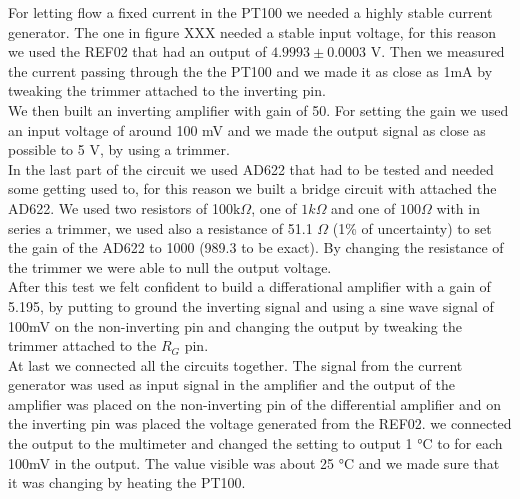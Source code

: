 For letting flow a fixed current in the PT100 we needed a highly stable current generator. The one in figure XXX needed a stable input voltage, for this  reason we used the REF02 that had an output of $4.9993 \pm 0.0003$ V. Then we measured the current passing through the the PT100 and we made it as close as 1mA by tweaking the trimmer attached to the inverting pin.\\

We then built an inverting amplifier with gain of 50. For setting the gain we used an input voltage of around 100 mV and we made the output signal as close as possible to 5 V, by using a trimmer.\\

In the last part of the circuit we used AD622 that had to be tested and needed some getting used  to, for this reason we built a bridge circuit with attached the AD622. We used two resistors of 100k$\Omega$, one of $1k\Omega$ and one of $100 \Omega$ with in series a trimmer, we used also a resistance of 51.1 $\Omega$ (1\% of uncertainty) to set the gain of the AD622 to 1000 (989.3 to be exact). By changing the resistance of the trimmer we were able to null the output voltage.\\

After this test we felt confident to build a differational amplifier with a gain of 5.195, by putting to ground the inverting signal and using a sine wave signal of 100mV on the non-inverting pin and changing the output by tweaking the trimmer attached to the $R_G$ pin.\\

At last we connected all the circuits together. The signal from the current generator was used as input signal in the amplifier and the output of the amplifier was placed on the non-inverting pin of the differential amplifier and on the inverting pin was placed the voltage generated from the REF02. we connected the output to the multimeter and changed the setting to output 1 °C to for each 100mV in the output. The value visible was about 25 °C and we made sure that  it was changing by heating the PT100.\\

